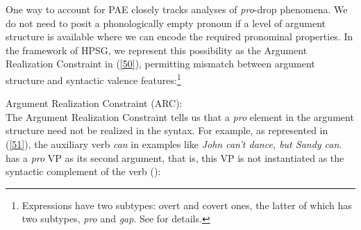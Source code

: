 \documentclass[output=paper
	        ,collection
	        ,collectionchapter
 	        ,biblatex
                ,babelshorthands
                ,newtxmath
                ,draftmode
                ,colorlinks, citecolor=brown
]{langscibook}
\begin{document}
{
\z
{}
\z
{}
\z
{}
\z
{}
\z
{}
\z
{}
\z

%

One way to account for PAE closely tracks analyses of {\it pro}-drop phenomena. We do not need to posit a phonologically empty pronoun if a level of argument structure is
available where we can encode the required pronominal properties\citep[see][]{Bresnan1982a, Kim2006, Ginzburg2018}. In the framework of HPSG, we represent this possibility as the Argument Realization Constraint in (\ref{50}), permitting mismatch between argument structure and syntactic valence features:\footnote{Expressions have two subtypes: overt and covert ones, the latter of which has two subtypes, \textit{pro} and \textit{gap}. See \citet{Sag2012a} for details.}

\ea
\label{50}
Argument Realization Constraint (ARC):\\
 \impl
{}
\z
The Argument Realization Constraint tells us that a \textit{pro} element
in the argument structure need not be realized in the syntax.
 For
example, as represented in (\ref{51}), the auxiliary
verb \textit{can} in examples like \textit{John can't dance, but Sandy can.}
has a \textit{pro} VP as its second argument, that is, this VP is not instantiated as the syntactic
complement of the verb (\citealt{Kim2006}): %

}
\end{document}
